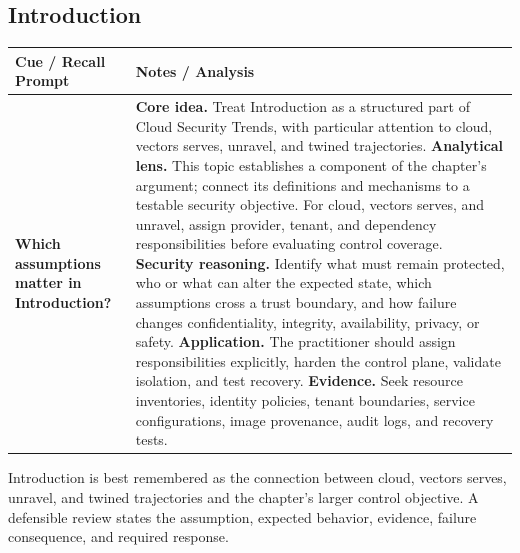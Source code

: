 \documentclass[11pt]{article}
\newcommand{\CornellHeader}{%
\rowcolor{Navy}\color{white}\bfseries Cue / Recall Prompt & \color{white}\bfseries Notes / Analysis\\\hline}
\newcommand{\CornellRow}[2]{%
\cellcolor{CueGray}\RaggedRight\textbf{#1} & \RaggedRight #2\\\hline}
\begin{document}
\subsection*{Introduction}
\begin{longtable}{>{\RaggedRight\arraybackslash}p{}|>{\RaggedRight\arraybackslash}p{}}
\CornellHeader
\CornellRow{Which assumptions matter in Introduction?}{\textbf{Core idea.} Treat Introduction as a structured part of Cloud Security Trends, with particular attention to cloud, vectors serves, unravel, and twined trajectories. \textbf{Analytical lens.} This topic establishes a component of the chapter's argument; connect its definitions and mechanisms to a testable security objective. For cloud, vectors serves, and unravel, assign provider, tenant, and dependency responsibilities before evaluating control coverage. \textbf{Security reasoning.} Identify what must remain protected, who or what can alter the expected state, which assumptions cross a trust boundary, and how failure changes confidentiality, integrity, availability, privacy, or safety. \textbf{Application.} The practitioner should assign responsibilities explicitly, harden the control plane, validate isolation, and test recovery. \textbf{Evidence.} Seek resource inventories, identity policies, tenant boundaries, service configurations, image provenance, audit logs, and recovery tests.}
\end{longtable}
\begin{topicsummary}
Introduction is best remembered as the connection between cloud, vectors serves, unravel, and twined trajectories and the chapter's larger control objective. A defensible review states the assumption, expected behavior, evidence, failure consequence, and required response.
\end{topicsummary}
\end{document}
